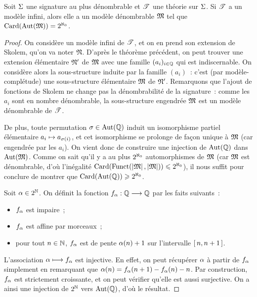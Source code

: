 \begin{theorem}
  Soit $\Sigma$ une signature au plus dénombrable et $\mathscr T$ une théorie sur
  $\Sigma$. Si $\mathscr T$ a un modèle infini, alors elle a un modèle dénombrable
  $\mathfrak{M}$ tel que $\operatorname{Card}(\operatorname{Aut}(\mathfrak{M})) = 2^{\aleph_0}$.
\end{theorem}

\begin{proof}
  On considère un modèle infini de $\mathscr T$, et on en prend son extension de
  Skolem, qu'on va noter $\mathfrak{N}$. D'après le théorème précédent, on peut
  trouver une extension élémentaire $\mathfrak{N}'$ de $\mathfrak{M}$ avec une famille
  $(a_i)_{i \in \mathbb Q}$ qui est indiscernable. On considère alors la sous-structure
  induite par la famille $(a_i)$~: c'est (par modèle-complétude) une
  sous-structure élémentaire $\mathfrak{M}$ de $\mathfrak{N}'$. Remarquons que l'ajout
  de fonctions de Skolem ne change pas la dénombrabilité de la signature~:
  comme les $a_i$ sont en nombre dénombrable, la sous-structure engendrée
  $\mathfrak{M}$ est un modèle dénombrable de $\mathscr T$.

  De plus, toute permutation $\sigma\in\operatorname{Aut}(\mathbb Q)$ induit un isomorphisme
  partiel élémentaire $a_i \mapsto a_{\sigma(i)}$, et cet isomorphisme se
  prolonge de façon unique à $\mathfrak{M}$ (car engendrée par les $a_i$). On
  vient donc de construire une injection de $\operatorname{Aut}(\mathbb Q)$ dans $\operatorname{Aut}(\mathfrak{M})$.
  Comme on sait qu'il y a au plus $2^{\aleph_0}$ automorphismes de $\mathfrak{M}$ (car
  $\mathfrak{M}$ est dénombrable, d'où l'inégalité
  $\operatorname{Card}(\operatorname{Funct}(\left\vert \mathfrak{M}\right\vert,\left\vert \mathfrak{M}\right\vert)) \leqslant 2^{\aleph_0}$), il nous suffit pour conclure
  de montrer que $\operatorname{Card}(\operatorname{Aut}(\mathbb Q)) \geqslant 2^{\aleph_0}$.

  Soit $\alpha \in 2^\mathbb N$. On définit la fonction
  $f_{\alpha} : \displaystyle \mathbb Q \longrightarrow \mathbb Q$ par les faits suivants~:
  \begin{itemize}
  \item $f_{\alpha}$ est impaire~;
  \item $f_{\alpha}$ est affine par morceaux~;
  \item pour tout $n \in \mathbb N$, $f_{\alpha}$ est de pente $\alpha(n) + 1$ sur
    l'intervalle $\mathord{\left[\,n,n+1\,\right]}$.
  \end{itemize}
  L'association $\alpha \longmapsto f_{\alpha}$ est injective. En effet, on
  peut récupérer $\alpha$ à partir de $f_{\alpha}$ simplement en remarquant
  que $\alpha(n) = f_{\alpha}(n+1) - f_{\alpha}(n) - n$. Par construction,
  $f_{\alpha}$ est strictement croissante, et on peut vérifier qu'elle est
  aussi surjective. On a ainsi une injection de $2^{\mathbb N}$ vers $\operatorname{Aut}(\mathbb Q)$,
  d'où le résultat.
\end{proof}

